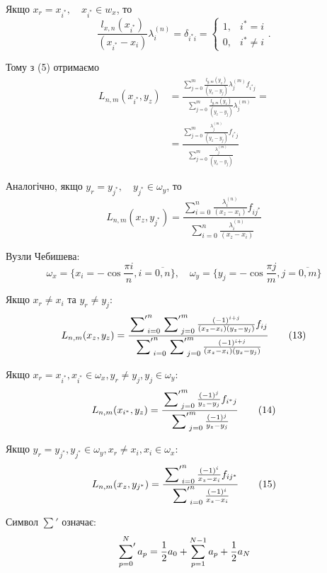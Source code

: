 Якщо $x_r = x_{i^*}, \quad x_{i^*} \in w_x$, то
\begin{equation*}
	\frac{l_{x,n}(x_{i^*})}{(x_{i^*} - x_i)} \lambda_i^{(n)} = \delta_{i^* i} = \begin{cases} 1, & i^*=i \\ 0, & i^* \neq i \end{cases} .
\end{equation*}

Тому з (5) отримаємо
\begin{align}
	L_{n,m}(x_{i^*}, y_z) &= \frac{\sum_{j=0}^{m} \frac{l_{y,m}(y_z)}{(y_z - y_j)} \lambda_j^{(m)} f_{i^* j}}{\sum_{j=0}^{m} \frac{l_{y,m}(y_z)}{(y_z - y_j)} \lambda_j^{(m)}} = \nonumber \\
	&= \frac{\sum_{j=0}^{m} \frac{\lambda_j^{(m)}}{(y_z - y_j)} f_{i^* j}}{\sum_{j=0}^{m} \frac{\lambda_j^{(m)}}{(y_z - y_j)}} \tag{8}
\end{align}

Аналогічно, якщо
$y_r = y_{j^*}, \quad y_{j^*} \in \omega_y$, то
\begin{equation}
	L_{n,m}(x_z, y_{j^*}) = \frac{\sum_{i=0}^{n} \frac{\lambda_i^{(n)}}{(x_z - x_i)} f_{i j^*}}{\sum_{i=0}^{n} \frac{\lambda_i^{(n)}}{(x_z - x_i)}} \tag{9}
\end{equation}

Вузли Чебишева:
\begin{equation}
	\omega_x = \{x_i = -\cos \frac{\pi i}{n}, i = \overline{0,n}\}, \quad \omega_y = \{y_j = -\cos \frac{\pi j}{m}, j = \overline{0,m}\} \tag{10}
\end{equation}

Якщо $x_r \ne x_i$ та $y_r \ne y_j$:
\begin{equation}
	L_{n,m}(x_z, y_z) = \frac{\sideset{}{'}\sum_{i=0}^{n} \sideset{}{'}\sum_{j=0}^{m} \frac{(-1)^{i+j}}{(x_z-x_i)(y_z-y_j)} f_{ij}}{\sideset{}{'}\sum_{i=0}^{n} \sideset{}{'}\sum_{j=0}^{m} \frac{(-1)^{i+j}}{(x_z-x_i)(y_z-y_j)}} \tag{13}
\end{equation}

Якщо $x_r = x_{i^*}, x_{i^*} \in \omega_x, y_r \ne y_j, y_j \in \omega_y$:
\begin{equation}
	L_{n,m}(x_{i^*}, y_z) = \frac{\sideset{}{'}\sum_{j=0}^{m} \frac{(-1)^j}{y_z-y_j} f_{i^* j}}{\sideset{}{'}\sum_{j=0}^{m} \frac{(-1)^j}{y_z-y_j}} \tag{14}
\end{equation}

Якщо $y_r = y_{j^*}, y_{j^*} \in \omega_y, x_r \ne x_i, x_i \in \omega_x$:
\begin{equation}
	L_{n,m}(x_z, y_{j^*}) = \frac{\sideset{}{'}\sum_{i=0}^{n} \frac{(-1)^i}{x_z-x_i} f_{i j^*}}{\sideset{}{'}\sum_{i=0}^{n} \frac{(-1)^i}{x_z-x_i}} \tag{15}
\end{equation}

Символ $\sum'$ означає:
\begin{equation*}
	\sideset{}{'}\sum_{p=0}^{N} a_p = \frac{1}{2} a_0 + \sum_{p=1}^{N-1} a_p + \frac{1}{2} a_N
\end{equation*}